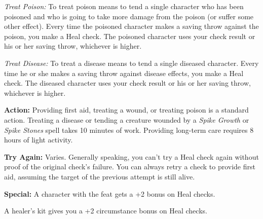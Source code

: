 \textit{Treat Poison:} To treat poison means to tend a single character who has 
been poisoned and who is going to take more damage from the poison (or suffer some 
other effect). Every time the poisoned character makes a saving throw against the 
poison, you make a Heal check. The poisoned character uses your check result or 
his or her saving throw, whichever is higher.

\textit{Treat Disease:} To treat a disease means to tend a single diseased character. 
Every time he or she makes a saving throw against disease effects, you make a Heal 
check. The diseased character uses your check result or his or her saving throw, 
whichever is higher.

\textbf{Action:} Providing first aid, treating a wound, or treating poison is a 
standard action. Treating a disease or tending a creature wounded by a \textit{Spike 
Growth} or \textit{Spike Stones} spell takes 10 minutes of work. Providing long-term 
care requires 8 hours of light activity.

\textbf{Try Again:} Varies. Generally speaking, you can't try a Heal check again 
without proof of the original check's failure. You can always retry a check to 
provide first aid, assuming the target of the previous attempt is still alive.

\textbf{Special:} A character with the  feat gets a +2 bonus on 
Heal checks.

A healer's kit gives you a +2 circumstance bonus on Heal checks.
